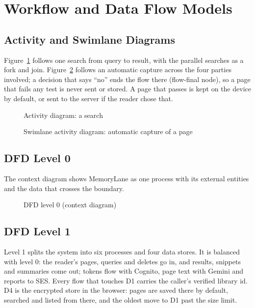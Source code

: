 \section{Workflow and Data Flow Models}

\subsection{Activity and Swimlane Diagrams}

Figure~\ref{fig:activity} follows one search from query to result, with the
parallel searches as a fork and join. Figure~\ref{fig:swimlane} follows an
automatic capture across the four parties involved; a decision that says
``no'' ends the flow there (flow-final node), so a page that fails any test
is never sent or stored. A page that passes is kept on the device by default,
or sent to the server if the reader chose that.

\begin{figure}[H]
\centering

\caption{Activity diagram: a search}
\label{fig:activity}
\end{figure}

\begin{figure}[H]
\centering

\caption{Swimlane activity diagram: automatic capture of a page}
\label{fig:swimlane}
\end{figure}

\subsection{DFD Level 0}

The context diagram shows MemoryLane as one process with its external
entities and the data that crosses the boundary.

\begin{figure}[H]
\centering

\caption{DFD level 0 (context diagram)}
\label{fig:dfd0}
\end{figure}

\subsection{DFD Level 1}

Level 1 splits the system into six processes and four data stores. It is
balanced with level 0: the reader's pages, queries and deletes go in, and
results, snippets and summaries come out; tokens flow with Cognito,
page text with Gemini and reports to SES. Every flow that touches D1 carries
the caller's verified library id. D4 is the encrypted store in the browser:
pages are saved there by default, searched and listed from there, and the
oldest move to D1 past the size limit.

